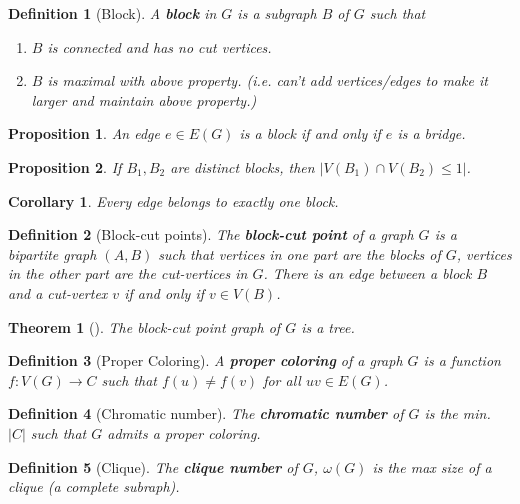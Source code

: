 \documentclass{article}
\newcommand{\size}[1]{|#1|}
\newcommand{\st}{such that }
\newtheorem*{definition}{Definition}
\newtheorem*{proposition}{Proposition}
\newtheorem*{theorem}{Theorem}
\newtheorem*{corollary}{Corollary}
\begin{document}
\begin{definition}[Block]
    A \textbf{block} in $ G $ is a subgraph $ B $ of $ G $ \st
    \begin{enumerate}
        \item $ B $ is connected and has no cut vertices.
        \item $ B $ is maximal with above property. (i.e. can't add vertices/edges to make it larger and maintain above property.)
    \end{enumerate}
\end{definition}

\begin{proposition}
    An edge $ e \in E(G) $ is a block if and only if $ e $ is a bridge.
\end{proposition}

\begin{proposition}
    If $ B_1, B_2 $ are distinct blocks, then $ \size{V(B_1) \cap V(B_2) \leq 1} $.
\end{proposition}

\begin{corollary}
    Every edge belongs to exactly one block.
\end{corollary}

\begin{definition}[Block-cut points]
    The \textbf{block-cut point} of a graph $ G $ is a bipartite graph $ (A,B) $ \st vertices in one part are the blocks of $ G $, vertices in the other
    part are the cut-vertices in $ G $. There is an edge between a block $ B $ and a cut-vertex $ v $ if and only if $ v \in V(B) $.
\end{definition}

\begin{theorem}[]
    The block-cut point graph of $ G $ is a tree.
\end{theorem}

\begin{definition}[Proper Coloring]
    A \textbf{proper coloring} of a graph $ G $ is a function $ f: V(G) \to C $ \st $ f(u) \neq f(v) $ for all $ uv \in E(G) $.
\end{definition}

\begin{definition}[Chromatic number]
    The \textbf{chromatic number} of $ G $ is the min. $ \size{C} $ \st $ G $ admits a proper coloring.
\end{definition}

\begin{definition}[Clique]
    The \textbf{clique number} of $ G $, $ \omega(G) $ is the max size of a clique (a complete subraph).
\end{definition}
\end{document}
